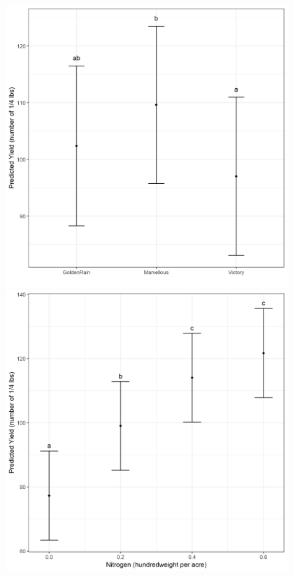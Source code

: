 \documentclass[a4paper, 10pt, fleqn, twosided]{memoir}
\begin{document}
\begin{tcolorbox}[title = Exercise 15 output continued]
\includegraphics[width=0.8\textwidth, frame]{Exercise15GenoPred.png}
\includegraphics[width=0.8\textwidth, frame]{Exercise15NitroPred.png}
\end{tcolorbox}
\end{document}
